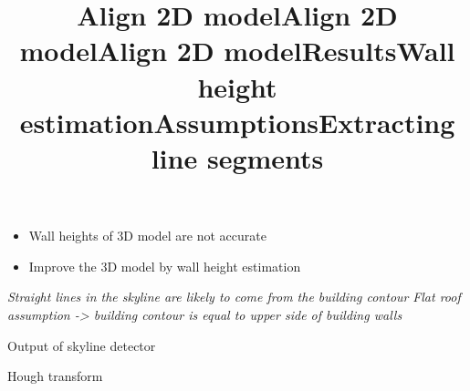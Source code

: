 \title{Align 2D model}


\title{Align 2D model}


\title{Align 2D model}

\title{Results}

\title{Wall height estimation}
\begin{itemize}
%
\item Wall heights of 3D model are not accurate
\item Improve the 3D model by wall height estimation
\end{itemize}

\title{Assumptions}
\emph{Straight lines in the skyline are likely to come from the building contour}
\emph{Flat roof assumption -> building contour is equal to upper side of building walls}

\title{Extracting line segments}
\item Output of skyline detector
\item Hough transform


